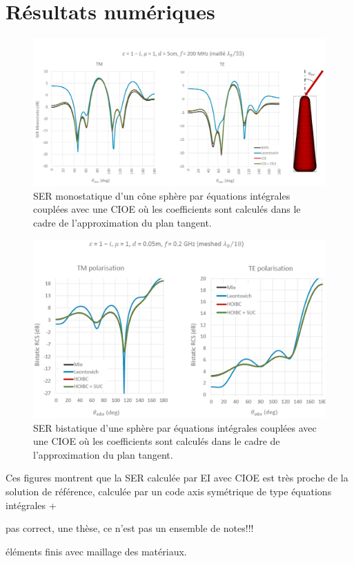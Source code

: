 \section{Résultats numériques}

  \begin{figure}[!hbt]
    \centering
    \includegraphics[width=\textwidth]{images/ser/cone_sphere_mono.png}
    \caption{SER monostatique d'un cône sphère par équations intégrales couplées avec une CIOE où les coefficients sont calculés dans le cadre de l'approximation du plan tangent.}
    \label{fig:ser:cone-sphere-mono-M1}
  \end{figure}


  \begin{figure}[!hbt]
    \centering
    \includegraphics[width=\textwidth]{images/ser/sphere_bis.png}
    \caption{SER bistatique d'une sphère par équations intégrales couplées avec une CIOE où les coefficients sont calculés dans le cadre de l'approximation du plan tangent.}
    \label{fig:ser:sphere-bis-M1}
  \end{figure}

  Ces figures montrent que la SER calculée par EI avec CIOE est très proche de la solution de référence, calculée par un code axis symétrique de type équations intégrales +
\begin{REM}
  pas correct, une thèse, ce n'est pas un ensemble de notes!!!
\end{REM} 
   éléments finis avec maillage des matériaux.
